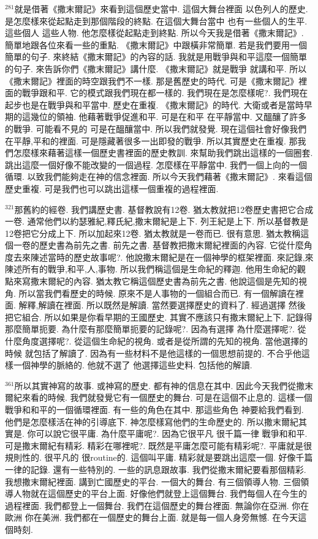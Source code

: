 \documentclass{book}
\begin{document}
$^{281}$就是借著《撒末爾記》來看到這個歷史當中.
這個大舞台裡面 以色列人的歷史.
是怎麼樣來從起點走到那個階段的終點.
在這個大舞台當中 也有一些個人的生平.
這些個人 這些人物.
他怎麼樣從起點走到終點.
所以今天我是借著《撒末爾記》.
簡單地跟各位來看一些的重點.
《撒末爾記》中跟橫非常簡單.
若是我們要用一個簡單的句子.
來終結《撒末爾記》的內容的話.
我就是用戰爭與和平這麼一個簡單的句子.
來告訴你們《撒末爾記》講什麼.
《撒末爾記》就是戰爭 就講和平.
所以《撒末爾記》裡面的時空跟我們不一樣.
那是舊歷史的時代.
可是《撒末爾記》裡面的戰爭跟和平.
它的模式跟我們現在都一樣的.
我們現在是怎麼樣呢?.
我們現在起步也是在戰爭與和平當中.
歷史在重複.
《撒末爾記》的時代.
大衛或者是當時早期的這幾位的領袖.
他藉著戰爭促進和平.
可是在和平 在平靜當中.
又醞釀了許多的戰爭.
可能看不見的 可是在醞釀當中.
所以我們就發覺.
現在這個社會好像我們在平靜,平和的裡面.
可是隱藏著很多一出即發的戰爭.
所以其實歷史在重複.
那我們怎麼樣來藉著這樣一個歷史書裡面的歷史教訓.
來幫助我們跳出這樣的一個圈套.
跳出這麼一個好像不能改變的一個過程.
怎麼樣在平靜當中.
我們一個上向的一個循環.
以致我們能夠走在神的信念裡面.
所以今天我們藉著《撒末爾記》.
來看這個歷史重複.
可是我們也可以跳出這樣一個重複的過程裡面.

$^{321}$那舊約的經卷.
我們講歷史書.
基督教說有12卷.
猶太教就把12卷歷史書把它合成一卷.
通常他們以約瑟雅紀,釋氏紀,撒末爾紀是上下.
列王紀是上下.
所以基督教是12卷把它分成上下.
所以加起來12卷.
猶太教就是一卷而已.
很有意思.
猶太教稱這個一卷的歷史書為前先之書.
前先之書.
基督教把撒末爾紀裡面的內容.
它從什麼角度去來陳述當時的歷史故事呢?.
他說撒末爾紀是在一個神學的框架裡面.
來記錄,來陳述所有的戰爭,和平,人,事物.
所以我們稱這個是生命紀的釋迦.
他用生命紀的觀點來寫撒末爾紀的內容.
猶太教它稱這個歷史書為前先之書.
他說這個是先知的視角.
所以當我們看歷史的時候.
原來不是人事物的一個組合而已.
有一個解讀在裡面.
解釋,解讀在裡面.
所以既然是解讀.
當然要選擇歷史的資料了.
經過選擇 然後把它組合.
所以如果是你看早期的王國歷史.
其實不應該只有撒末爾紀上下.
記錄得那麼簡單扼要.
為什麼有那麼簡單扼要的記錄呢?.
因為有選擇 為什麼選擇呢?.
從什麼角度選擇呢?.
從這個生命紀的視角.
或者是從所謂的先知的視角.
當他選擇的時候 就包括了解讀了.
因為有一些材料不是他這樣的一個思想前提的.
不合乎他這樣一個神學的脈絡的.
他就不選了 他選擇這些史料.
包括他的解讀.

$^{361}$所以其實神寫的故事.
或神寫的歷史.
都有神的信息在其中.
因此今天我們從撒末爾紀來看的時候.
我們就發覺它有一個歷史的舞台.
可是在這個不止息的.
這樣一個戰爭和和平的一個循環裡面.
有一些的角色在其中.
那這些角色 神要給我們看到.
他們是怎麼樣活在神的引導底下.
神怎麼樣寫他們的生命歷史的.
所以撒末爾紀其實是.
你可以說它很平庸.
為什麼平庸呢?.
因為它很平凡 很千篇一律 戰爭和和平.
可是撒末爾紀有精彩.
精彩在哪裡呢?.
既然是平庸怎麼可能有精彩呢?.
平庸就是很規則性的.
很平凡的 很routine的.
這個叫平庸.
精彩就是要跳出這麼一個.
好像千篇一律的記錄.
還有一些特別的.
一些的訊息跟故事.
我們從撒末爾紀要看那個精彩.
我想撒末爾紀裡面.
講到亡國歷史的平台.
一個大的舞台.
有三個領導人物.
三個領導人物就在這個歷史的平台上面.
好像他們就登上這個舞台.
我們每個人在今生的過程裡面.
我們都登上一個舞台.
我們在這個歷史的舞台裡面.
無論你在亞洲.
你在歐洲 你在美洲.
我們都在一個歷史的舞台上面.
就是每一個人身旁無憾.
在今天這個時刻.
\end{document}
